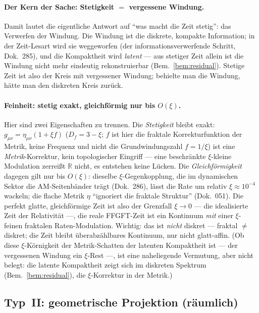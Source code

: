 \paragraph{Der Kern der Sache: Stetigkeit $=$ vergessene Windung.} Damit lautet die
eigentliche Antwort auf ``was macht die Zeit stetig'': das Verwerfen der Windung. Die
Windung ist die diskrete, kompakte Information; in der Zeit-Lesart wird sie weggeworfen
(der informationsverwerfende Schritt, Dok.~285), und die Kompaktheit wird \emph{latent} ---
aus stetiger Zeit allein ist die Windung nicht mehr eindeutig rekonstruierbar
(Bem.~\ref{bem:residual}). Stetige Zeit ist also der Kreis mit vergessener Windung;
behielte man die Windung, h\"atte man den diskreten Kreis zur\"uck.

\paragraph{Feinheit: stetig exakt, gleichf\"ormig nur bis $O(\xi)$.} Hier sind zwei
Eigenschaften zu trennen. Die \emph{Stetigkeit} bleibt exakt: $g_{\mu\nu}=\eta_{\mu\nu}(1+\xi
f)$ ($D_f=3-\xi$; $f$ ist hier die fraktale Korrekturfunktion der Metrik, keine
Frequenz und nicht die Grundwindungszahl $f=1/\xi$) ist eine \emph{Metrik}-Korrektur, kein topologischer Eingriff --- eine
beschr\"ankte $\xi$-kleine Modulation zerrei\ss t $\mathbb{R}$ nicht, es entstehen keine
L\"ucken. Die \emph{Gleichf\"ormigkeit} dagegen gilt nur bis $O(\xi)$: dieselbe
$\xi$-Gegenkopplung, die im dynamischen Sektor die AM-Seitenb\"ander tr\"agt (Dok.~286),
l\"asst die Rate um relativ $\xi\approx10^{-4}$ wackeln; die flache Metrik $\eta$ ``ignoriert
die fraktale Struktur'' (Dok.~051). Die perfekt glatte, gleichf\"ormige Zeit ist also der
Grenzfall $\xi\to0$ --- die idealisierte Zeit der Relativit\"at ---, die reale FFGFT-Zeit ist
ein Kontinuum \emph{mit} einer $\xi$-feinen fraktalen Raten-Modulation. Wichtig: das ist
\emph{nicht} diskret --- fraktal $\neq$ diskret; die Zeit bleibt \"uberabz\"ahlbares
Kontinuum, nur nicht glatt-affin. (Ob diese $\xi$-K\"ornigkeit der Metrik-Schatten der
latenten Kompaktheit ist --- der vergessenen Windung ein $\xi$-Rest ---, ist eine
naheliegende Vermutung, aber nicht belegt: die latente Kompaktheit zeigt sich im diskreten
Spektrum (Bem.~\ref{bem:residual}), die $\xi$-Korrektur in der Metrik.)

\subsection{Typ~II: geometrische Projektion (r\"aumlich)}

